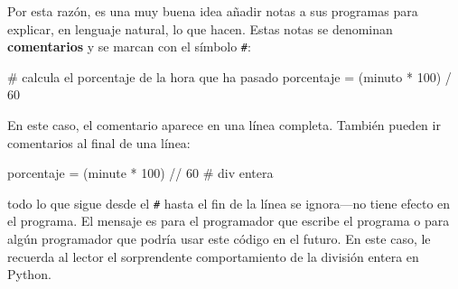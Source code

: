 Por esta razón, es una muy buena idea añadir notas a sus programas
para explicar, en lenguaje natural, lo que hacen. Estas notas se denominan
\textbf{comentarios }y se marcan con el símbolo \texttt{\#}:

\begin{pythoncode}
# calcula el porcentaje de la hora que ha pasado
porcentaje = (minuto * 100) / 60
\end{pythoncode}
En este caso, el comentario aparece en una línea completa. También
pueden ir comentarios al final de una línea:

\begin{pythoncode}
porcentaje = (minute * 100) // 60 # div entera
\end{pythoncode}

todo lo que sigue desde el \texttt{\#} hasta el fin de la línea se
ignora—no tiene efecto en el programa. El mensaje es para el programador
que escribe el programa o para algún programador que podría usar este
código en el futuro. En este caso, le recuerda al lector el sorprendente
comportamiento de la división entera en Python.

